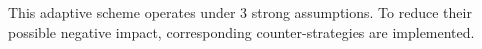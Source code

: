 \documentclass[./\jobname.tex]{subfiles}
\begin{document}
\begin{figure}[H]
	\centering
	\noindent{}
	\label{fig:uml_flow_adaptive_scheme}
\end{figure}
This adaptive scheme operates under 3 strong assumptions. To reduce their possible negative impact, corresponding counter-strategies are implemented. 
\end{document}
